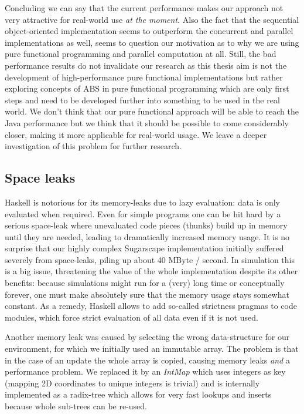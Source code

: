 Concluding we can say that the current performance makes our approach not very attractive for real-world use \textit{at the moment}. Also the fact that the sequential object-oriented implementation seems to outperform the concurrent and parallel implementations as well, seems to question our motivation as to why we are using pure functional programming and parallel computation at all. Still, the bad performance results do not invalidate our research as this thesis aim is not the development of high-performance pure functional implementations but rather exploring concepts of ABS in pure functional programming which are only first steps and need to be developed further into something to be used in the real world. We don't think that our pure functional approach will be able to reach the Java performance but we think that it should be possible to come considerably closer, making it more applicable for real-world usage. We leave a deeper investigation of this problem for further research.

\subsection{Space leaks}
Haskell is notorious for its memory-leaks due to lazy evaluation: data is only evaluated when required. Even for simple programs one can be hit hard by a serious space-leak where unevaluated code pieces (thunks) build up in memory until they are needed, leading to dramatically increased memory usage. It is no surprise that our highly complex Sugarscape implementation initially suffered severely from space-leaks, piling up about 40 MByte / second. In simulation this is a big issue, threatening the value of the whole implementation despite its other benefits: because simulations might run for a (very) long time or conceptually forever, one must make absolutely sure that the memory usage stays somewhat constant. As a remedy, Haskell allows to add so-called strictness pragmas to code modules, which force strict evaluation of all data even if it is not used. %

Another memory leak was caused by selecting the wrong data-structure for our environment, for which we initially used an immutable array. The problem is that in the case of an update the whole array is copied, causing memory leaks \textit{and} a performance problem. We replaced it by an \textit{IntMap} which uses integers as key (mapping 2D coordinates to unique integers is trivial) and is internally implemented as a radix-tree which allows for very fast lookups and inserts because whole sub-trees can be re-used.

